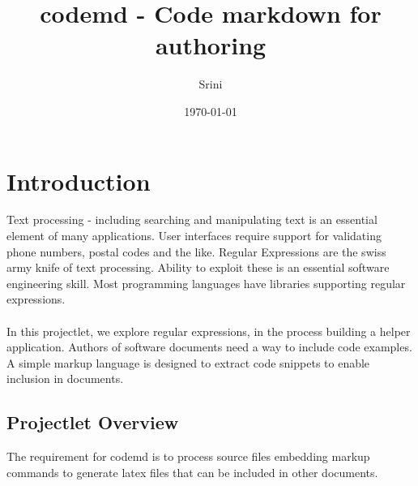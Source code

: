 \documentclass[12pt, a4paper]{article}
\title{codemd - Code markdown for authoring}
\begin{document}
\author{Srini}
\date{\small \today} 
\maketitle
\section{Introduction}

Text processing - including searching and manipulating text is an essential element of many applications. User interfaces require support for validating phone numbers, postal codes and the like. Regular Expressions are the swiss army knife of text processing. Ability to exploit these is an essential software engineering skill. Most programming languages have libraries
supporting regular expressions.

\paragraph{} In this projectlet, we explore regular expressions, in the process building a helper application. Authors of software documents need a way to include code examples. A simple markup language is designed to extract code snippets to enable inclusion in documents.

\subsection{Projectlet Overview}
The requirement for codemd is to process source files embedding markup commands to generate latex files that can be included in other documents.
\end{document}
